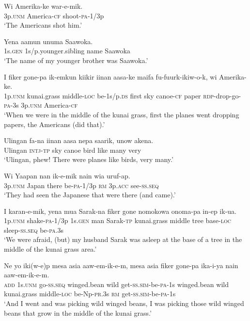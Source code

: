 \ea
\gll  Wi  Amerika-ke  war-e-mik. \\
3p.\textsc{unm}  America-\textsc{cf}  shoot-\textsc{pa}-1/3p \\
\glt ‘The Americans shot him.’ \\
\z


\ea
\gll  Yena  aamun  unuma  Saawoka. \\
1s.\textsc{gen}  1s/p.younger.sibling  name  Saawoka \\
\glt ‘The name of my younger brother was Saawoka.’ \\
\z


\ea
\gll  I  fiker  gone-pa  ik-emkun  kiikir  iinan  aasa-ke maifa  fu-fuurk-ikiw-o-k,  wi  Amerika-ke. \\
1p.\textsc{unm}  kunai.grass  middle-\textsc{loc}  be-1s/p.\textsc{ds}  first  sky  canoe-\textsc{cf} paper  \textsc{rdp}-drop-go-\textsc{pa}-3s  3p.\textsc{unm}  America-\textsc{cf} \\
\glt ‘When we were in the middle of the kunai grass, first the planes went dropping papers, the Americans (did that).’ \\
\z


\ea
\gll  Ulingan  fa-na  iinan  aasa  nepa  saarik,  unow  akena. \\
Ulingan  \textsc{intj}-\textsc{tp}  sky  canoe  bird  like  many  very \\
\glt ‘Ulingan, phew! There were planes like birds, very many.’ \\
\z


\ea
\gll  Wi  Yaapan  nan  ik-e-mik  nain  wia  uruf-ap. \\
3p.\textsc{unm}  Japan  there  be-\textsc{pa}-1/3p  \textsc{rm}  3p.\textsc{acc}  see-\textsc{ss.seq} \\
\glt ‘They had seen the Japanese that were there (and came).’ \\
\z


\ea
\gll  I  karan-e-mik,  yena  mua  Sarak-na  fiker  gone  nomokowa  onoma-pa  in-ep  ik-ua. \\
1p.\textsc{unm}  shake-\textsc{pa}-1/3p  1s.\textsc{gen}  man  Sarak-\textsc{tp}  kunai.grass middle  tree  base-\textsc{loc}  sleep-\textsc{ss.seq}  be-\textsc{pa}.3s \\
\glt ‘We were afraid, (but) my husband Sarak was asleep at the base of a tree in the middle of the kunai grass area.’ \\
\z


\ea
\gll  Ne  yo  iki(w-e)p  mesa  asia  aaw-em-ik-e-m, mesa  asia  fiker  gone-pa  ika-i-ya  nain  aaw-em-ik-e-m. \\
\textsc{add}  1s.\textsc{unm}  go-\textsc{ss.seq}  winged.bean  wild  get-\textsc{ss}.\textsc{sim}-be-\textsc{pa}-1s winged.bean  wild  kunai.grass  middle-\textsc{loc}  be-Np-\textsc{pr}.3s  \textsc{rm} get-\textsc{ss}.\textsc{sim}-be-\textsc{pa}-1s\\ 
\glt ‘And I went and was picking wild winged beans, I was picking those wild winged beans that grow in the middle of the kunai grass.’ \\
\z


